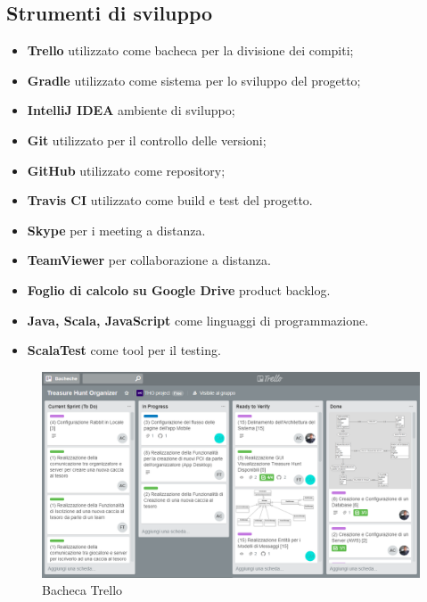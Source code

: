 \documentclass[12pt, italian]{article}
\begin{document}
\subsection{Strumenti di sviluppo}
\begin{itemize}
	\item \textbf{Trello} utilizzato come bacheca per la divisione dei compiti;
	\item \textbf{Gradle} utilizzato come sistema per lo sviluppo del progetto;
	\item \textbf{IntelliJ IDEA} ambiente di sviluppo;
	\item \textbf{Git} utilizzato per il controllo delle versioni;
	\item \textbf{GitHub} utilizzato come repository;
	\item \textbf{Travis CI} utilizzato come build e test del progetto.
    \item \textbf{Skype} per i meeting a distanza.
    \item \textbf{TeamViewer} per collaborazione a distanza.
    \item \textbf{Foglio di calcolo su Google Drive} product backlog.
    \item \textbf{Java, Scala, JavaScript} come linguaggi di programmazione.
    \item \textbf{ScalaTest} come tool per il testing.
\end{itemize}

\begin{figure}[H]
    \centering
    \includegraphics[width=1\textwidth]{img/trello01.png}
    \caption{Bacheca Trello}
\end{figure}

\newpage
\end{document}
